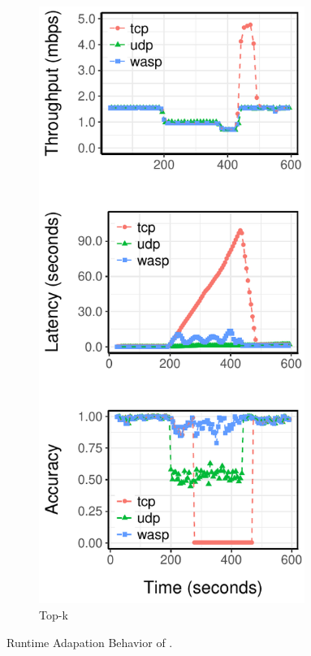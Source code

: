 \begin{figure}[t!]
\begin{subfigure}[t]{0.30\textwidth}
    \includegraphics[width=0.95\textwidth]{figures/cdn-runtime}
    \caption{Top-k}
  \end{subfigure}
  \caption{Runtime Adapation Behavior of \sysname{}.  }
  \label{fig:runtime}
\end{figure}

